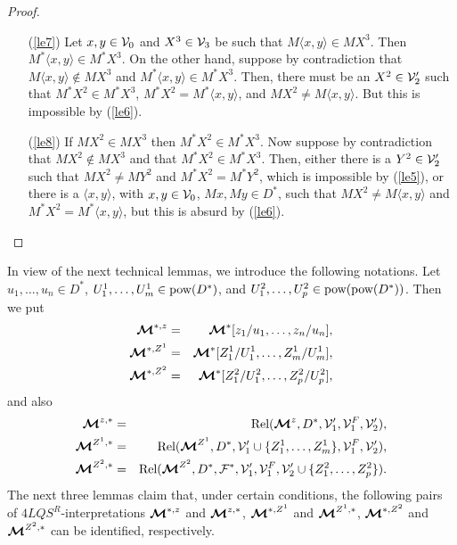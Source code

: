 \documentclass{fundam}
\newcommand{\model}{\ensuremath{\mbox{\boldmath $\mathcal{M}$}}\xspace}
\newcommand{\pow}{\mbox{\rm pow}}
\newcommand{\Rel}{\mbox{\rm Rel}}
\newcommand{\QLQSR}{\ensuremath{\mbox{$4\mathit{LQS}^{R}$}}\xspace}
\begin{document}
\begin{proof}
\begin{itemize}
\item [(\ref{le7})] Let $x,y \in {\cal V}_{0}$ and $X^3 \in {\cal
V}_{3}$ be such that $M\langle x,y\rangle \in MX^3$.  Then $M^*
\langle x,y\rangle \in M^*X^3$.  On the other hand, suppose by
contradiction that $M\langle x,y\rangle \notin MX^3$ and $M^* \langle
x,y\rangle \in M^*X^3$.  Then, there must be an $X^2 \in {\cal
V}_{2}'$ such that $M^*X^2 \in M^* X^3$, $M^* X^2 = M^*\langle
x,y\rangle$, and $MX^2 \neq M\langle x,y\rangle$.  But this is
impossible by (\ref{le6}).

\item [(\ref{le8})] If $MX^2 \in MX^3$ then $M^*X^2 \in M^*X^3$.  Now
suppose by contradiction that $MX^2 \notin MX^3$ and that $M^*X^2 \in
M^*X^3$.  Then, either there is a $Y^2 \in {\cal V}_2'$ such that
$MX^2 \neq MY^2$ and $M^*X^2 = M^*Y^2$, which is impossible by
(\ref{le5}), or there is a $\langle x,y\rangle$, with $x,y \in {\cal
V}_{0}$, $Mx,My \in D^*$, such that $MX^2 \neq M\langle x,y\rangle$
and $M^*X^2 = M^*\langle x,y\rangle$, but this is absurd by
(\ref{le6}).\end{itemize}
\end{proof}

In view of the next technical lemmas, we introduce the following
notations.  Let $u_1,\ldots,u_n\in D^*$,
$U_{1}^{1},\ldots,U_{m}^{1}\in \pow(D^{*})$, and
$U_{1}^{2},\ldots,U_{p}^{2}\in \pow(\pow(D^{*}))$.  Then we put
\begin{eqnarray*}
    \model^{*,z} & = & \model^{*}[z_{1}/u_{1},\ldots,z_{n}/u_{n}], \\
    \model^{*,Z^1} & = & \model^{*}[Z_{1}^{1}/U_{1}^{1},\ldots,Z_{m}^{1}/U_{m}^{1}], \\
    \model^{*,Z^2} & = & \model^{*}[Z_{1}^{2}/U_{1}^{2},\ldots,Z_{p}^{2}/U_{p}^{2}],
\end{eqnarray*}
and also
\begin{eqnarray*}
    \model^{z,*} & = & \Rel(\model^{z},D^{*}, {\cal V}'_{1}, {\cal V}_{1}^{F}, {\cal V}'_{2}),\\
    \model^{Z^1,*} & = & \Rel(\model^{Z^{1}},D^{*},{\cal V}'_{1} \cup
                         \{Z_{1}^{1},\ldots,Z_{m}^{1}\}, {\cal V}_{1}^{F}, {\cal V}'_{2}),\\
    \model^{Z^2,*} & = & \Rel(\model^{Z^{2}},D^{*},\mathcal{F}^{*},{\cal V}'_{1}, {\cal V}_{1}^{F}, {\cal V}'_{2}\cup
                         \{Z_{1}^{2},\ldots,Z_{p}^{2}\}).
\end{eqnarray*}
The next three lemmas claim that, under certain conditions, the
following pairs of $\QLQSR$-interpretations $\model^{*,z}$ and
$\model^{z,*}$, $\model^{*,Z^1}$ and $\model^{Z^1,*}$,
$\model^{*,Z^2}$ and $\model^{Z^2,*}$ can be
identified, respectively.
\end{document}
